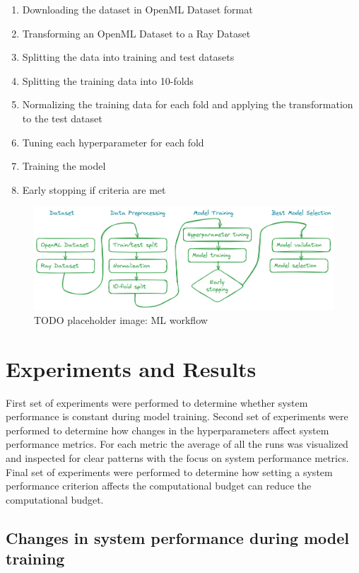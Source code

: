 \begin{enumerate}
    \item Downloading the dataset in OpenML Dataset format
    \item Transforming an OpenML Dataset to a Ray Dataset
    \item Splitting the data into training and test datasets
    \item Splitting the training data into 10-folds
    \item Normalizing the training data for each fold and applying the transformation to the test dataset
    \item Tuning each hyperparameter for each fold
    \item Training the model
    \item Early stopping if criteria are met
\end{enumerate}

\begin{figure}[h]
    \includegraphics[width=12cm]{assets/ml_workflow1.png}
    \caption{TODO placeholder image: ML workflow}
    \label{figure:mlworkflow}
\end{figure}

\section{Experiments and Results}

First set of experiments were performed to determine whether system performance is constant during model training. Second set of experiments were performed to determine how changes in the hyperparameters affect system performance metrics. For each metric the average of all the runs was visualized and inspected for clear patterns with the focus on system performance metrics. Final set of experiments were performed to determine how setting a system performance criterion affects the computational budget can reduce the computational budget.




\subsection{Changes in system performance during model training}



